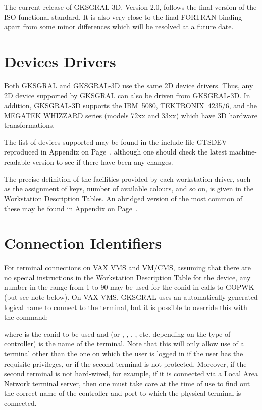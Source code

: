 The current release of GKSGRAL-3D, Version 2.0, follows the final version of
the ISO functional standard. It is also very close to the final FORTRAN binding
apart from some minor differences which will be resolved at a future date.
\section{Devices Drivers}
 
Both GKSGRAL and GKSGRAL-3D use the same 2D device drivers.
Thus, any 2D device supported by GKSGRAL can also be driven from
GKSGRAL-3D. In addition, GKSGRAL-3D supports the IBM~5080,
TEKTRONIX~4235/6, and the MEGATEK WHIZZARD series (models 72xx and 33xx)
which have 3D hardware transformations.
 
The list of devices supported may be found in the include file
GTSDEV reproduced in Appendix on Page~\pageref{sec:gtstyp}.
although one should check the latest machine-readable version to see
if there have been any changes.
 
The precise definition of the facilities provided by each workstation
driver, such as the assignment of keys, number of available colours,
and so on, is given in the Workstation Description Tables.
An abridged version of the most common of these may be found in
Appendix on Page~\pageref{sec:wdtref}.
\section{\protect\label{sec:conref}Connection Identifiers}
 
For terminal connections on VAX VMS and VM/CMS, assuming that there are
no special instructions in the Workstation Description Table for the
device, any number in the range from 1 to 90 may be used for the conid
in calls to GOPWK (but see note below).
On VAX VMS, GKSGRAL uses an automatically-generated logical name to connect
to the terminal, but it is possible to override this with the command:
\begin{XMP}
\end{XMP}
where  is the conid to be used and 
(or , , , , etc. 
depending on the type of controller)
is the name of the terminal.
Note that this will only allow use of a terminal other than the one on which
the user is logged in if the user has the requisite privileges,
or if the second terminal is not protected.
Moreover, if the second terminal is not hard-wired, for example, if it is
connected via a Local Area Network terminal server, then one must take care
at the time of use to find out the correct name of the controller and port
to which the physical terminal is connected.
 
